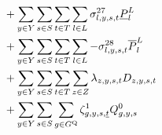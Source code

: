 \documentclass{article}
\begin{document}
\begin{align}
%
%
& + \sum\limits_{\iYear \in \sYears}\sum\limits_{\iScenario \in \sScenarios}\sum\limits_{\iInterval \in \sIntervals} \sum\limits_{\iLink \in \sLinks} \dMinPowerFlow \cPowerFlowMin\\
& + \sum\limits_{\iYear \in \sYears}\sum\limits_{\iScenario \in \sScenarios}\sum\limits_{\iInterval \in \sIntervals} \sum\limits_{\iLink \in \sLinks} - \dMaxPowerFlow \cPowerFlowMax\\
& + \sum\limits_{\iYear \in \sYears}\sum\limits_{\iScenario \in \sScenarios}\sum\limits_{\iInterval \in \sIntervals} \sum\limits_{\iZone \in \sZones} \dPowerBalance \cDemand\\
& + \sum\limits_{\iYear \in \sYears}\sum\limits_{\iScenario \in \sScenarios}\sum\limits_{\iGenerator \in \sStorage} \dStorageEnergyTransition[\iGenerator,\iYear,\iScenario,\iIntervalStart] \cStorageEnergyInitial\\

\end{align}
\end{document}
